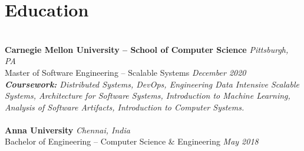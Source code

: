 \documentclass{resume}
\author{https://aravindvasu.dev}{Aravind Vasudevan}
\begin{document}
\maketitle
\section*{Education}
\titlerule
\noindent
\\
\textbf{Carnegie Mellon University -- School of Computer Science} \hfill \textit{Pittsburgh, PA} \\
{\small Master of Software Engineering -- Scalable Systems} \hfill \textit{\small December 2020}\\
\textit{\textbf{Coursework:} Distributed Systems, DevOps, Engineering Data Intensive Scalable Systems, Architecture for Software Systems, Introduction to Machine Learning, Analysis of Software Artifacts, Introduction to Computer Systems.}\\
\\
\textbf{Anna University} \hfill \textit{Chennai, India} \\
{\small Bachelor of Engineering -- Computer Science \& Engineering} \hfill \textit{\small May 2018}
\end{document}

